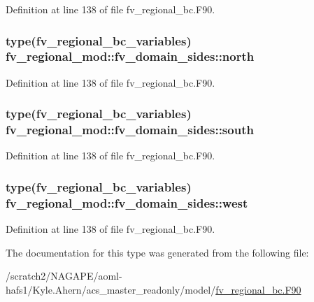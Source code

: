 Definition at line 138 of file fv\-\_\-regional\-\_\-bc.\-F90.

\subsubsection[{north}]{\setlength{\rightskip}{0pt plus 5cm}type({\bf fv\-\_\-regional\-\_\-bc\-\_\-variables}) fv\-\_\-regional\-\_\-mod\-::fv\-\_\-domain\-\_\-sides\-::north\hspace{0.3cm}{\ttfamily [private]}}\label{structfv__regional__mod_1_1fv__domain__sides_a6a402489c7a747378659aa9cb5c71ccc}


Definition at line 138 of file fv\-\_\-regional\-\_\-bc.\-F90.

\subsubsection[{south}]{\setlength{\rightskip}{0pt plus 5cm}type({\bf fv\-\_\-regional\-\_\-bc\-\_\-variables}) fv\-\_\-regional\-\_\-mod\-::fv\-\_\-domain\-\_\-sides\-::south\hspace{0.3cm}{\ttfamily [private]}}\label{structfv__regional__mod_1_1fv__domain__sides_ac4624a2514b912d5a1c07ecf9ff7d60b}


Definition at line 138 of file fv\-\_\-regional\-\_\-bc.\-F90.

\subsubsection[{west}]{\setlength{\rightskip}{0pt plus 5cm}type({\bf fv\-\_\-regional\-\_\-bc\-\_\-variables}) fv\-\_\-regional\-\_\-mod\-::fv\-\_\-domain\-\_\-sides\-::west\hspace{0.3cm}{\ttfamily [private]}}\label{structfv__regional__mod_1_1fv__domain__sides_af38228133162c39631151b32cd934d36}


Definition at line 138 of file fv\-\_\-regional\-\_\-bc.\-F90.



The documentation for this type was generated from the following file\-:\begin{DoxyCompactItemize}
\item 
/scratch2/\-N\-A\-G\-A\-P\-E/aoml-\/hafs1/\-Kyle.\-Ahern/acs\-\_\-master\-\_\-readonly/model/\hyperlink{fv__regional__bc_8F90}{fv\-\_\-regional\-\_\-bc.\-F90}\end{DoxyCompactItemize}
